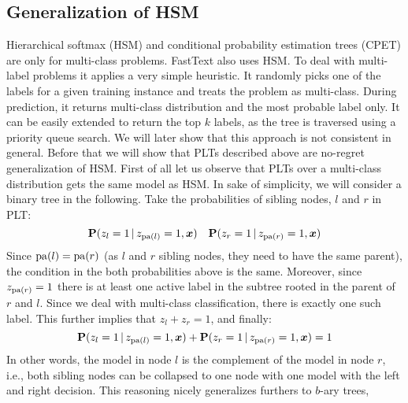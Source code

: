 \documentclass{article}
\newcommand{\prob}{\mathbf{P}}
\newcommand{\sectionBefore}{-0pt}
\newcommand{\sectionAfter}{-0pt}
\begin{document}
\vspace{\sectionBefore}
\subsection{Generalization of HSM}
\label{sec:online_PLTs}
\vspace{\sectionAfter}

Hierarchical softmax (HSM) and conditional probability estimation trees (CPET) are only for multi-class problems. 
FastText also uses HSM. To deal with multi-label problems it applies a very simple heuristic. It randomly picks one of the labels for a given training instance and treats the problem as multi-class. During prediction, it returns multi-class distribution and the most probable label only. It can be easily extended to return the top $k$ labels, as the tree is traversed using a priority queue search. We will later show that this approach is not consistent in general. Before that we will show that PLTs described above are no-regret generalization of HSM. First of all let us observe that PLTs over a multi-class distribution gets the same model as HSM. In sake of simplicity, we will consider a binary tree in the following.  
Take the probabilities of sibling nodes, $l$ and $r$ in PLT:
$$
\prob(z_l = 1 \given z_{\pa{l}} =1, \bx) \quad \prob(z_r = 1 \given z_{\pa{r}} =1, \bx)
$$
Since $\mathrm{pa}(l) = \mathrm{pa}(r)$ (as $l$ and $r$ sibling nodes, they need to have the same parent), the condition in the both probabilities above is the same. Moreover, since $z_{\mathrm{pa}(r)} =1$ there is at least one active label in the subtree rooted in the parent of $r$ and $l$. Since we deal with multi-class classification, there is exactly one such label. This further implies that $z_l + z_r = 1$, and finally: 
$$
\prob(z_l = 1 \given z_{\pa{l}} =1, \bx) + \prob(z_r = 1 \given z_{\pa{r}} =1, \bx) = 1 
$$
In other words, the model in node $l$ is the complement of the model in node $r$, i.e., both sibling nodes can be collapsed to one node with one model with the left and right decision. This reasoning nicely generalizes furthers to $b$-ary trees,
\end{document}
